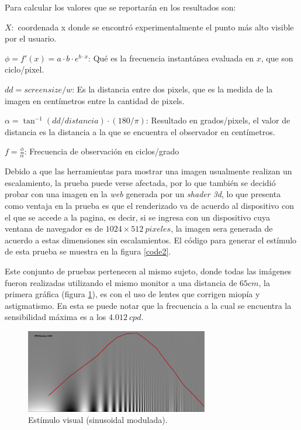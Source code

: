 \documentclass[conference]{IEEEtran}
\def\shadowLine{\vspace{3mm}}
\begin{document}
Para calcular los valores que se reportarán en los resultados son:

$X:$ coordenada x donde se encontró experimentalmente el punto más alto visible por el usuario.

$\phi=f'(x)= a\cdot b\cdot e^{b\cdot x}$: Qué es la frecuencia instantánea evaluada en $x$, que son ciclo/pixel.

$dd = screensize/w$: Es la distancia entre dos pixels, que es la medida de la imagen en centímetros entre la cantidad de pixels.

$\alpha= \tan^{-1}(dd/distancia)\cdot (180/\pi)$: Resultado en grados/pixels, el valor de distancia es la distancia a la que se encuentra el observador en centímetros.

\shadowLine
$f=\displaystyle\frac{\phi}{\alpha}$: Frecuencia de observación en ciclos/grado


Debido a que las herramientas para mostrar una imagen usualmente realizan un
escalamiento, la prueba puede verse afectada, por lo que también se decidió probar con una imagen en la \textit{web} generada por un \textit{shader 3d}, lo que
presenta como ventaja en la prueba es que el renderizado va de acuerdo al dispositivo
con el que se accede a la pagina, es decir, si se ingresa con un dispositivo
cuya ventana de navegador es de $1024 \times 512\ pixeles$, la imagen sera generada de
acuerdo a estas dimensiones sin escalamientos. El código para generar el estímulo de esta prueba se muestra en la figura \ref{code2}.


Este conjunto de pruebas pertenecen al mismo sujeto, donde todas las imágenes fueron
realizadas utilizando el mismo monitor a una distancia de $65cm$, la primera
gráfica (figura \ref{normal}), es con el uso de lentes que corrigen miopía y astigmatismo.
En esta se puede notar que la frecuencia a la cual se encuentra la sensibilidad
máxima es a los $4.012\ cpd$.

\begin{figure}[htbp]
\centerline{\includegraphics[width=80mm]{code/Normal}}
\caption{Estímulo visual (sinusoidal modulada).}
\label{normal}
\end{figure}
\end{document}
